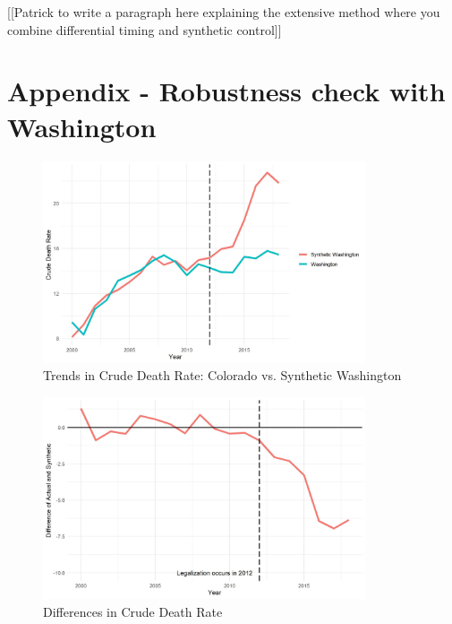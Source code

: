 \documentclass{article}
\begin{document}
[[Patrick to write a paragraph here explaining the extensive method where you combine differential timing and synthetic control]]

\section{Appendix - Robustness check with Washington}







\begin{figure}[H]
	\begin{center}
		\includegraphics[width=0.85\textwidth]{trends_plot_washington}
	\end{center}
	\caption{Trends in Crude Death Rate: Colorado vs. Synthetic Washington}
	\label{fig:trends_plot_washington}
\end{figure}

\begin{figure}[H]
	\begin{center}
		\includegraphics[width=0.85\textwidth]{diffs_plot_washington}
	\end{center}
	\caption{Differences in Crude Death Rate}
	\label{fig:diffs_plot_washington}
\end{figure}
\end{document}
